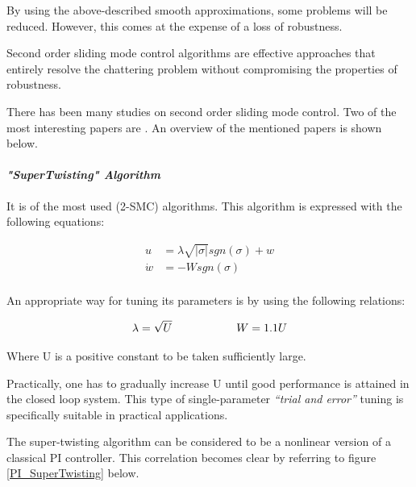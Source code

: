 \documentclass{thesisreport}
\begin{document}
By using the above-described smooth approximations, some problems will be reduced. However, this comes at the expense of a loss of robustness.


Second order sliding mode control algorithms are effective approaches that entirely resolve the chattering problem without compromising the properties of robustness.


There has been many studies on second order sliding mode control. Two of the most interesting papers are \cite{Levant1993, Bartolini1999}. An overview of the mentioned papers is shown below.


\paragraph{\textit{"SuperTwisting" Algorithm}}

It is of the most used (2-SMC) algorithms. This algorithm is expressed with the following equations:

\begin{equation}
\begin{aligned}
	u &= \lambda \sqrt{|\sigma|}sgn(\sigma) + w \\
	\dot{w} &= -W sgn (\sigma) \\
\end{aligned}
\end{equation}


									
An appropriate way for tuning its parameters is by using the following relations: 

\begin{equation}
\lambda = \sqrt{U} \text{\hspace{2cm}} W = 1.1U
\end{equation}



\noindent Where U is a positive constant to be taken sufficiently large.



\noindent Practically, one has to gradually increase U until good performance is attained in the closed loop system. This type of single-parameter \textit{“trial and error”} tuning is specifically suitable in practical applications.

\noindent The super-twisting algorithm can be considered to be a nonlinear version of a classical PI controller. This correlation becomes clear by referring to figure \ref{PI_SuperTwisting} below.
\end{document}
